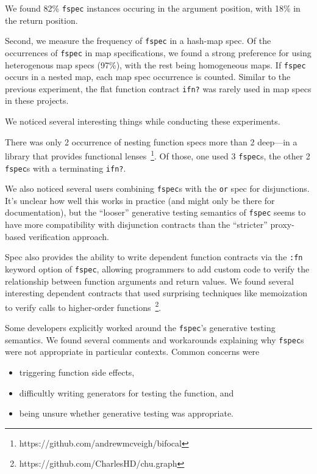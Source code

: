 We found 82\% \texttt{fspec} instances occuring in the argument position,
with 18\% in the return position.

Second, we measure the frequency of \texttt{fspec} in a hash-map spec.
Of the occurrences of \texttt{fspec} in map specifications, 
we found a strong preference for using heterogenous map specs (97\%),
with the rest being homogeneous maps.
If \texttt{fspec} occurs in a nested map, each map spec occurrence is counted.
Similar to the previous experiment, the flat function contract \texttt{ifn?} was rarely used 
in map specs in these projects.

We noticed several interesting things while conducting these experiments.

There was only 2 occurrence of nesting function specs more than 2 deep---in a library
that provides functional lenses~\footnote{https://github.com/andrewmcveigh/bifocal}.
Of those, one used 3 \texttt{fspec}s, the other 2 \texttt{fspec}s with a terminating \texttt{ifn?}.

We also noticed several users combining \texttt{fspec}s with the \texttt{or} spec
for disjunctions. It's unclear how well this works in practice (and might only be
there for documentation), but the ``looser'' generative testing semantics of \texttt{fspec}
seems to have more compatibility with disjunction contracts than the ``stricter''
proxy-based verification approach.

Spec also provides the ability to write dependent function contracts via the \texttt{:fn}
keyword option of \texttt{fspec}, allowing programmers
to add custom code to verify the relationship between function arguments and return values.
We found several interesting dependent contracts that used surprising techniques like
memoization to verify calls to higher-order functions~\footnote{https://github.com/CharlesHD/chu.graph}.

Some developers explicitly worked around the \texttt{fspec}'s generative testing semantics.
We found several comments and workarounds explaining why \texttt{fspec}s were not
appropriate in particular contexts. Common concerns were
\\
\begin{itemize}
	\item triggering function side effects,
	\item difficultly writing generators for testing the function, and
	\item being unsure whether generative testing was appropriate.
\end{itemize}

